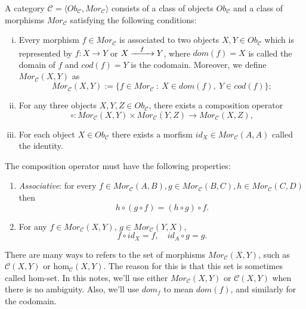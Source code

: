 \begin{definition}[Category]
	A category $\mathcal C = \langle Ob_{\mathcal C}, Mor_{\mathcal C} \rangle$ consists
	of a class of objects $Ob_\mathcal C$ and a class of morphisms
	$Mor_\mathcal C$ satisfying the following conditions:
  \begin{enumerate}[(i)]
    \item Every morphism $f \in Mor_\mathcal C$ is associated to two objects $X,Y \in Ob_{\mathcal C}$
      which is represented by $f:X \to Y$ or $X \xrightarrow{\hspace{3mm}f \hspace{3mm}} Y$,
      where $dom(f) = X$ is called the domain of $f$ and $cod(f)=Y$ is the codomain. Moreover, we define
      $Mor_\mathcal C (X,Y)$ as 
      \begin{displaymath}
        Mor_\mathcal C (X,Y) := \{f \in Mor_\mathcal C \ : \ X \in dom(f), \ Y \in cod(f)\};
      \end{displaymath}
    \item For any three objects $X,Y, Z \in Ob_\mathcal C$, there exists a composition operator
      \begin{displaymath}
        \circ: Mor_\mathcal C (X,Y)   \times Mor_\mathcal C (Y,Z) \to Mor_\mathcal C (X,Z),
      \end{displaymath}
      \item For each object $X \in Ob_\mathcal C$ there exists a morfism $id_X \in Mor_\mathcal C (A,A)$
        called the identity.
  \end{enumerate}
  The composition operator must have the following properties:
  \begin{enumerate}[(p.1)]
    \item \textit{Associative}: for every $f \in Mor_\mathcal C (A,B),
      g \in Mor_\mathcal C (B,C), h \in Mor_\mathcal C (C,D)$ then
      \begin{displaymath}
        h \circ (g \circ f) = (h \circ g) \circ f.
      \end{displaymath}
    \item For any $f \in Mor_\mathcal C (X,Y)$, $g \in Mor_\mathcal C (Y,X)$, 
      \begin{displaymath}
        f \circ id_X = f,  \quad id_A \circ g = g.
      \end{displaymath}
  \end{enumerate}
\end{definition}

There are many ways to refers to the set of morphisms $Mor_\mathcal C (X,Y)$, such as
$\mathcal C(X,Y)$ or $\text{hom}_\mathcal C (X,Y)$. The reason for this is that
this set is sometimes called hom-set. In this notes, we'll use either $Mor_\mathcal C (X,Y)$
or $\mathcal C (X,Y)$ when there is no ambiguity. Also, we'll use $dom_f$ to mean $dom(f)$,
and similarly for the codomain.

